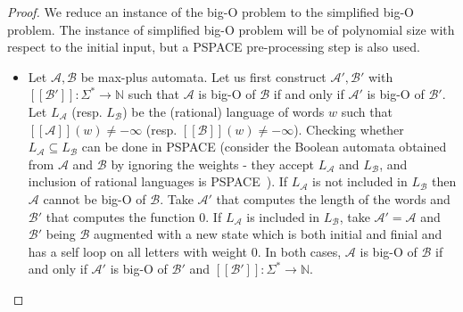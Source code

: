 \documentclass[10pt,a4paper]{amsart}
\theoremstyle{definition}
\numberwithin{equation}{section}
\theoremstyle{remark}
\newcommand{\N}{\mathbb{N}}
\newcommand{\autA}{\mathcal{A}}
\newcommand{\autB}{\mathcal{B}}
\newcommand{\brfunc}[1]{[\![#1]\!]}
\newcommand{\funcA}{\brfunc{\autA}}
\newcommand{\funcB}{\brfunc{\autB}}
\theoremstyle{remark}
\begin{document}
\begin{proof}
We reduce an instance of the big-O problem to the simplified big-O problem. The instance of simplified big-O problem will be of polynomial size with respect to the initial input, but a PSPACE pre-processing step is also used.
\begin{itemize}
\item Let $\autA,\autB$ be max-plus automata. Let us first construct $\autA',\autB'$ with $\brfunc{\autB'}:\Sigma^* \to \N$ such that $\autA$ is big-O of $\autB$ if and only if  $\autA'$ is big-O of $\autB'$. Let $L_\autA$ (resp. $L_\autB$) be the (rational) language of words $w$ such that $\funcA(w) \neq -\infty$ (resp. $\funcB(w) \neq -\infty$). Checking whether $L_\autA \subseteq L_\autB$ can be done in PSPACE (consider the Boolean automata obtained from $\autA$ and $\autB$ by ignoring the weights - they accept $L_\autA$ and $L_\autB$, and inclusion of rational languages is PSPACE~\cite{MeyerS72}). If $L_\autA$ is not included in $L_\autB$ then $\autA$ cannot be big-O of $\autB$. Take $\autA'$ that computes the length of the words and $\autB'$ that computes the function $0$. If $L_\autA$ is included in $L_\autB$, take $\autA' = \autA$ and $\autB'$ being $\autB$ augmented with a new state which is both initial and finial and has a self loop on all letters with weight $0$. In both cases, $\autA$ is big-O of $\autB$ if and only if  $\autA'$ is big-O of $\autB'$ and $\brfunc{\autB'}:\Sigma^* \to \N$.


\end{itemize}
\end{proof}
\end{document}
